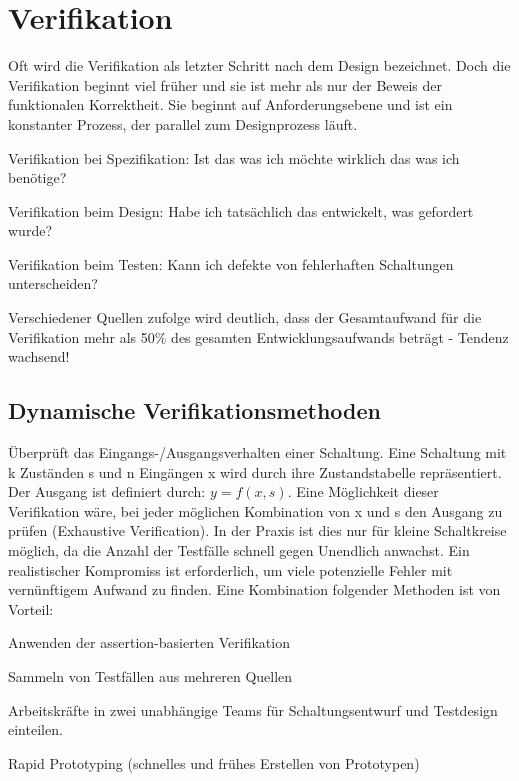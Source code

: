 \section{Verifikation}
Oft wird die Verifikation als letzter Schritt nach dem Design bezeichnet. Doch die Verifikation beginnt viel früher und sie ist mehr als nur der Beweis der funktionalen Korrektheit. Sie beginnt auf Anforderungsebene und ist ein konstanter Prozess, der parallel zum Designprozess läuft.
\begin{compactitem}
    \item Verifikation bei Spezifikation: Ist das was ich möchte wirklich das was ich benötige?
    \item Verifikation beim Design: Habe ich tatsächlich das entwickelt, was gefordert wurde?
    \item Verifikation beim Testen: Kann ich defekte von fehlerhaften Schaltungen unterscheiden?
\end{compactitem}
Verschiedener Quellen zufolge wird deutlich, dass der Gesamtaufwand für die Verifikation mehr als 50\% des gesamten Entwicklungsaufwands beträgt - Tendenz wachsend!

\subsection{Dynamische Verifikationsmethoden}
Überprüft das Eingangs-/Ausgangsverhalten einer Schaltung. Eine Schaltung mit k Zuständen s und n Eingängen x wird durch ihre Zustandstabelle repräsentiert. Der Ausgang ist definiert durch: $y=f(x,s)$. Eine Möglichkeit dieser Verifikation wäre, bei jeder möglichen Kombination von x und s den Ausgang zu prüfen (Exhaustive Verification). In der Praxis ist dies nur für kleine Schaltkreise möglich, da die Anzahl der Testfälle schnell gegen Unendlich anwachst. Ein realistischer Kompromiss ist erforderlich, um viele potenzielle Fehler mit vernünftigem Aufwand zu finden. Eine Kombination folgender Methoden ist von Vorteil:
\begin{compactitem}
    \item Anwenden der assertion-basierten Verifikation
    \item Sammeln von Testfällen aus mehreren Quellen
    \item Arbeitskräfte in zwei unabhängige Teams für Schaltungsentwurf und Testdesign einteilen.
    \item Rapid Prototyping (schnelles und frühes Erstellen von Prototypen)
\end{compactitem}

